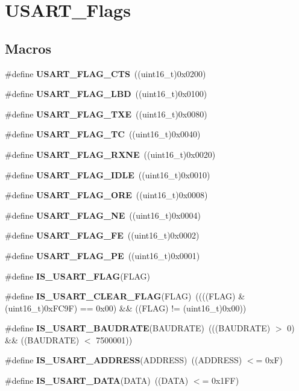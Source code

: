 \section{U\+S\+A\+R\+T\+\_\+\+Flags}
\label{group__USART__Flags}
\subsection*{Macros}
\begin{DoxyCompactItemize}
\item 
\#define \textbf{ U\+S\+A\+R\+T\+\_\+\+F\+L\+A\+G\+\_\+\+C\+TS}~((uint16\+\_\+t)0x0200)
\item 
\#define \textbf{ U\+S\+A\+R\+T\+\_\+\+F\+L\+A\+G\+\_\+\+L\+BD}~((uint16\+\_\+t)0x0100)
\item 
\#define \textbf{ U\+S\+A\+R\+T\+\_\+\+F\+L\+A\+G\+\_\+\+T\+XE}~((uint16\+\_\+t)0x0080)
\item 
\#define \textbf{ U\+S\+A\+R\+T\+\_\+\+F\+L\+A\+G\+\_\+\+TC}~((uint16\+\_\+t)0x0040)
\item 
\#define \textbf{ U\+S\+A\+R\+T\+\_\+\+F\+L\+A\+G\+\_\+\+R\+X\+NE}~((uint16\+\_\+t)0x0020)
\item 
\#define \textbf{ U\+S\+A\+R\+T\+\_\+\+F\+L\+A\+G\+\_\+\+I\+D\+LE}~((uint16\+\_\+t)0x0010)
\item 
\#define \textbf{ U\+S\+A\+R\+T\+\_\+\+F\+L\+A\+G\+\_\+\+O\+RE}~((uint16\+\_\+t)0x0008)
\item 
\#define \textbf{ U\+S\+A\+R\+T\+\_\+\+F\+L\+A\+G\+\_\+\+NE}~((uint16\+\_\+t)0x0004)
\item 
\#define \textbf{ U\+S\+A\+R\+T\+\_\+\+F\+L\+A\+G\+\_\+\+FE}~((uint16\+\_\+t)0x0002)
\item 
\#define \textbf{ U\+S\+A\+R\+T\+\_\+\+F\+L\+A\+G\+\_\+\+PE}~((uint16\+\_\+t)0x0001)
\item 
\#define \textbf{ I\+S\+\_\+\+U\+S\+A\+R\+T\+\_\+\+F\+L\+AG}(F\+L\+AG)
\item 
\#define \textbf{ I\+S\+\_\+\+U\+S\+A\+R\+T\+\_\+\+C\+L\+E\+A\+R\+\_\+\+F\+L\+AG}(F\+L\+AG)~((((F\+L\+AG) \& (uint16\+\_\+t)0x\+F\+C9\+F) == 0x00) \&\& ((\+F\+L\+A\+G) != (uint16\+\_\+t)0x00))
\item 
\#define \textbf{ I\+S\+\_\+\+U\+S\+A\+R\+T\+\_\+\+B\+A\+U\+D\+R\+A\+TE}(B\+A\+U\+D\+R\+A\+TE)~(((B\+A\+U\+D\+R\+A\+TE) $>$ 0) \&\& ((B\+A\+U\+D\+R\+A\+TE) $<$ 7500001))
\item 
\#define \textbf{ I\+S\+\_\+\+U\+S\+A\+R\+T\+\_\+\+A\+D\+D\+R\+E\+SS}(A\+D\+D\+R\+E\+SS)~((A\+D\+D\+R\+E\+SS) $<$= 0x\+F)
\item 
\#define \textbf{ I\+S\+\_\+\+U\+S\+A\+R\+T\+\_\+\+D\+A\+TA}(D\+A\+TA)~((D\+A\+TA) $<$= 0x1\+F\+F)
\end{DoxyCompactItemize}


